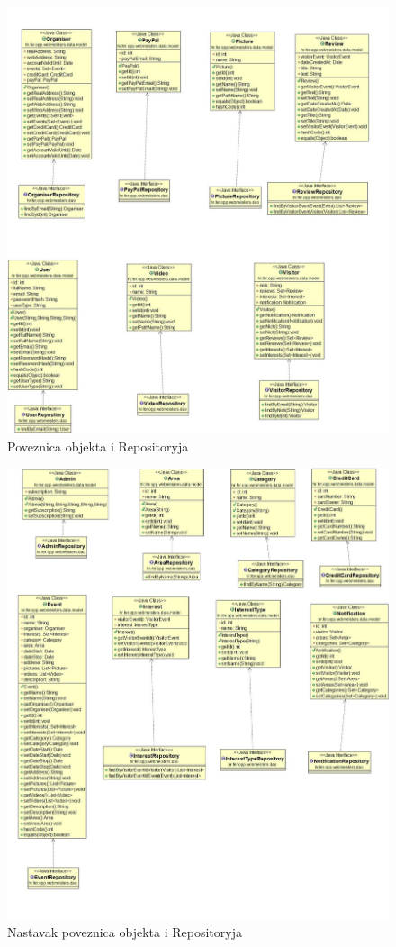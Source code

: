 		\begin{figure}[H]
			\includegraphics[scale=0.4]{slike/dijagram2a.jpg}
			\centering
			\caption{Poveznica objekta i Repositoryja}
			\label{fig:dijagramraz3}
		\end{figure}
	
		\begin{figure}[H]
			\includegraphics[scale=0.4]{slike/dijagram2b.jpg}
			\centering
			\caption{Nastavak poveznica objekta i Repositoryja}
			\label{fig:dijagramraz4}
		\end{figure}
		
